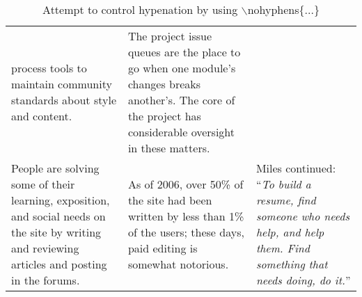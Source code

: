 \documentclass[article,a4paper,12pt,twoside]{memoir}
\newcounter{123listcolonstylectr}
\begin{document}
\begin{table}
\begin{center}
{\begin{tabular}{|p{}|p{}|p{}|}
{process tools to maintain community standards about style and
content.} & \nohyphens{The project issue queues are the place to go when one
module's changes breaks another's. The core of the project has
considerable oversight in these
matters.}\\
\nohyphens{People are solving some of their learning, exposition, and social
needs on the site by writing and reviewing articles and posting in the
forums.}& \nohyphens{As of 2006, over 50\% of the site had been written by less
than 1\% of the users; these days, paid editing is somewhat
notorious.}& \nohyphens{Miles continued: ``\emph{To build a resume, find someone
  who needs help, and help them.  Find something that needs doing, do
  it.}}'' \\ \hline
\end{tabular}
}
\end{center}
\caption{Attempt to control hypenation by using $\backslash$nohyphens\{...\}}
\end{table}
\end{document}
